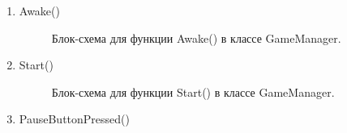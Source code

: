 \documentclass[14pt, oneside]{altsu-report}
\begin{document}
\begin{enumerate}
\item Awake()

\begin{figure}[H]
\caption{Блок-схема для функции Awake() в классе GameManager.}
\end{figure}

\item Start()

\begin{figure}[H]
\caption{Блок-схема для функции Start() в классе GameManager.}
\end{figure}

\item PauseButtonPressed()


\end{enumerate}
\end{document}
